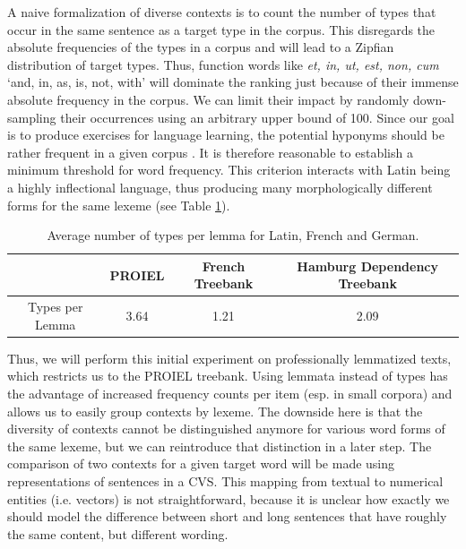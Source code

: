 \documentclass[oneside]{book}
\begin{document}
A naive formalization of diverse contexts is to count the number of types that occur in the same sentence as a target type in the corpus. This disregards the absolute frequencies of the types in a corpus and will lead to a Zipfian distribution \parencite[VI]{zipfPsychobiologyLanguageIntroduction1936} of target types. Thus, function words like \textit{et, in, ut, est, non, cum} `and, in, as, is, not, with' will dominate the ranking just because of their immense absolute frequency in the corpus. We can limit their impact by randomly down-sampling their occurrences using an arbitrary upper bound of 100.
\label{high_frequency_hyponyms_for_language_learning}
Since our goal is to produce exercises for language learning, the potential hyponyms should be rather frequent in a given corpus \parencites[27]{ellisUsagebasedLanguageInvestigating2013}[2]{robillardMonolingualBilingualChildren2014}. It is therefore reasonable to establish a minimum threshold for word frequency. This criterion interacts with Latin being a highly inflectional language, thus producing many morphologically different forms for the same lexeme (see Table \ref{tableTypesPerLemma}).
\begin{table}[ht]
	\begin{tabular}{ c | c | c | c }
  		 & PROIEL & French Treebank & Hamburg Dependency Treebank \\ \hline
  		Types per Lemma & 3.64 & 1.21 & 2.09 \\
	\end{tabular}
	\caption{Average number of types per lemma for Latin, French and German.}
	\label{tableTypesPerLemma}
\end{table}

Thus, we will perform this initial experiment on professionally lemmatized texts, which restricts us to the PROIEL treebank. Using lemmata instead of types has the advantage of increased frequency counts per item (esp. in small corpora) and allows us to easily group contexts by lexeme. The downside here is that the diversity of contexts cannot be distinguished anymore for various word forms of the same lexeme, but we can reintroduce that distinction in a later step. The comparison of two contexts for a given target word will be made using representations of sentences in a \gls{CVS}. This mapping from textual to numerical entities (i.e. vectors) is not straightforward, because it is unclear how exactly we should model the difference between short and long sentences that have roughly the same content, but different wording. 
\end{document}

